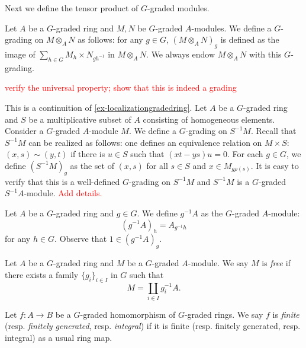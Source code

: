 Next we define the tensor product of $G$-graded modules.
\begin{definition}
    Let $A$ be a $G$-graded ring and $M,N$ be $G$-graded $A$-modules. We define a $G$-grading on $M\otimes_A N$ as follows: for any $g\in G$, $(M\otimes_A N)_g$ is defined as the image of $\sum_{h\in G}M_h\times N_{gh^{-1}}$ in $M\otimes_A N$. We always endow $M\otimes_A N$ with this $G$-grading.
\end{definition}
\textcolor{red}{verify the universal property; show that this is indeed a grading}

\begin{example}\label{ex-localizationgradedmodule}
    This is a continuition of \cref{ex-localizationgradedring}.
    Let $A$ be a $G$-graded ring and $S$ be a multiplicative subset of $A$ consisting of homogeneous elements. Consider a $G$-graded $A$-module $M$. We define a $G$-grading on $S^{-1}M$. Recall that $S^{-1}M$ can be realized as follows: one defines an equivalence relation on $M\times S$: $(x,s)\sim (y,t)$ if there is $u\in S$ such that $(xt-ys)u=0$. For each $g\in G$, we define $(S^{-1}M)_g$ as the set of $(x,s)$ for all $s\in S$ and $x\in M_{g\rho(s)}$. It is easy to verify that this is a well-defined $G$-grading on $S^{-1}M$ and $S^{-1}M$ is a $G$-graded $S^{-1}A$-module.  \textcolor{red}{Add details.}
\end{example}

\begin{example}\label{ex-twistmodule}
    Let $A$ be a $G$-graded ring and $g\in G$. We define $g^{-1}A$ as the $G$-graded $A$-module:
    \[
        (g^{-1}A)_h=A_{g^{-1}h}
    \]
    for any $h\in G$. Observe that $1\in (g^{-1}A)_g$.
\end{example}

\begin{definition}
    Let $A$ be a $G$-graded ring and $M$ be a $G$-graded $A$-module. We say $M$ is \emph{free} if there exists a family $\{g_i\}_{i\in I}$ in $G$ such that
    \[
        M=\coprod_{i\in I} g_i^{-1}A.  
    \]
\end{definition}

\begin{definition}
    Let $f:A\rightarrow B$ be a $G$-graded homomorphism of $G$-graded rings. We say $f$ is \emph{finite} (resp. \emph{finitely generated}, resp. \emph{integral}) if it is finite (resp. finitely generated, resp. integral) as a usual ring map.
\end{definition}


